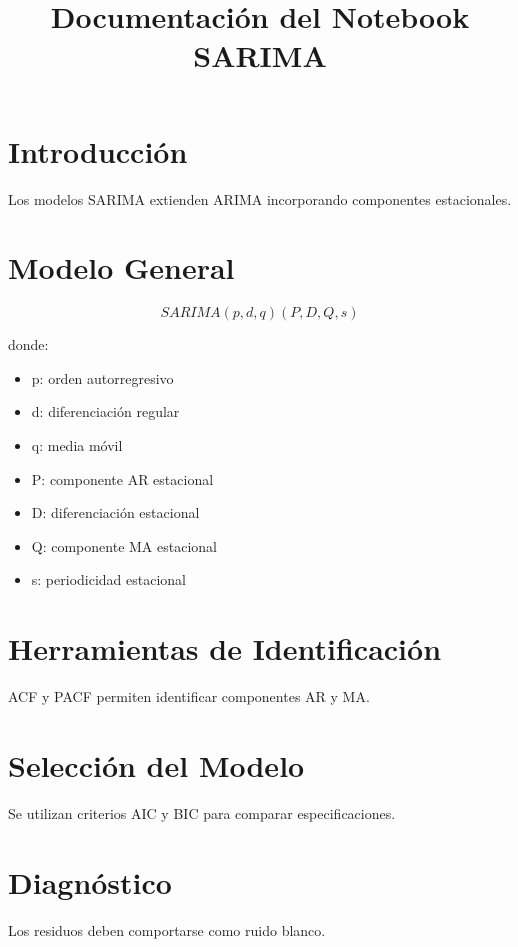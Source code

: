 \documentclass[11pt]{article}
\title{Documentación del Notebook SARIMA}
\date{}
\begin{document}
\maketitle

\section{Introducción}
Los modelos SARIMA extienden ARIMA incorporando componentes estacionales.

\section{Modelo General}
\[
SARIMA(p,d,q)(P,D,Q,s)
\]

donde:
\begin{itemize}
\item p: orden autorregresivo
\item d: diferenciación regular
\item q: media móvil
\item P: componente AR estacional
\item D: diferenciación estacional
\item Q: componente MA estacional
\item s: periodicidad estacional
\end{itemize}

\section{Herramientas de Identificación}
ACF y PACF permiten identificar componentes AR y MA.

\section{Selección del Modelo}
Se utilizan criterios AIC y BIC para comparar especificaciones.

\section{Diagnóstico}
Los residuos deben comportarse como ruido blanco.
\end{document}
